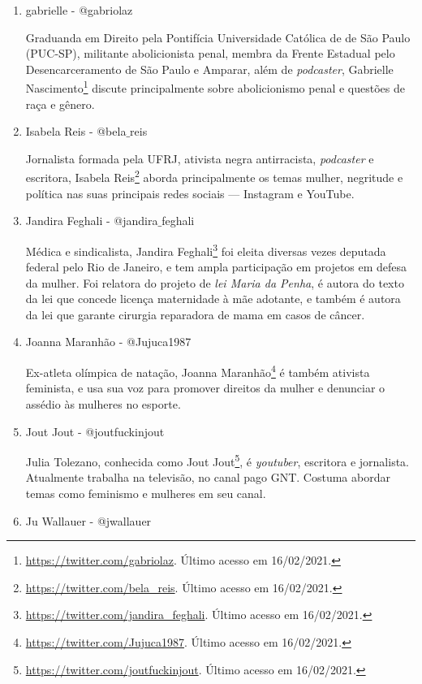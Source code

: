 \documentclass[
	12pt,				%
	openright,			%
	twoside,			%
	a4paper,			%
	english,			%
	brazil				%
	]{abntex2}
\begin{document}
\begin{anexosenv}
\begin{enumerate}
 \item gabrielle - @gabriolaz
 
 Graduanda em Direito pela Pontifícia Universidade Católica de de São Paulo (PUC-SP), militante abolicionista penal, membra da Frente Estadual pelo Desencarceramento de São Paulo e Amparar, além de \textit{podcaster}, Gabrielle Nascimento\footnote{\url{https://twitter.com/gabriolaz}. Último acesso em 16/02/2021.} discute principalmente sobre abolicionismo penal e questões de raça e gênero.

 \item Isabela Reis - @bela$\_$reis\label{belareis}
 
 Jornalista formada pela UFRJ, ativista negra antirracista, \textit{podcaster} e escritora, Isabela Reis\footnote{\url{https://twitter.com/bela_reis}. Último acesso em 16/02/2021.} aborda principalmente os temas mulher, negritude e política nas suas principais redes sociais --- Instagram e YouTube.
 
 \item Jandira Feghali - @jandira$\_$feghali
 
 Médica e sindicalista, Jandira Feghali\footnote{\url{https://twitter.com/jandira_feghali}. Último acesso em 16/02/2021.} foi eleita diversas vezes deputada federal pelo Rio de Janeiro, e tem ampla participação em projetos em defesa da mulher. Foi relatora do projeto de \textit{lei Maria da Penha}, é autora do texto da lei que concede licença maternidade à mãe adotante, e também é autora da lei que garante cirurgia reparadora de mama em casos de câncer.

 \item Joanna Maranhão - @Jujuca1987
 
 Ex-atleta olímpica de natação, Joanna Maranhão\footnote{\url{https://twitter.com/Jujuca1987}. Último acesso em 16/02/2021.} é também ativista feminista, e usa sua voz para promover direitos da mulher e denunciar o assédio às mulheres no esporte.

 \item Jout Jout - @joutfuckinjout
 
 Julia Tolezano, conhecida como Jout Jout\footnote{\url{https://twitter.com/joutfuckinjout}. Último acesso em 16/02/2021.}, é \textit{youtuber}, escritora e jornalista. Atualmente trabalha na televisão, no canal pago GNT. Costuma abordar temas como feminismo e mulheres em seu canal.

 \item Ju Wallauer - @jwallauer
 

\end{enumerate}
\end{anexosenv}
\end{document}
